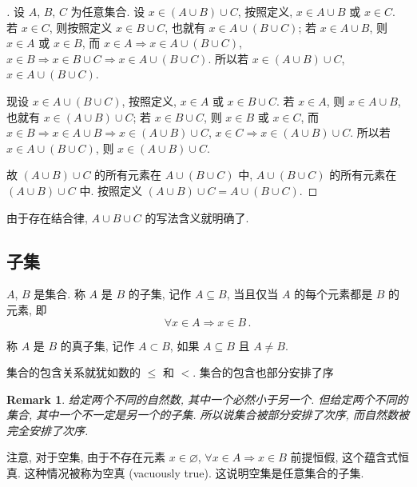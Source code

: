 \documentclass[UTF8]{ctexart}
\theoremstyle{mystyle}
\theoremstyle{myremark}
\newtheorem*{remark}{Remark}
\theoremstyle{plain}
\begin{document}
\begin{proof}[]
    设 $ A $, $ B $, $ C $ 为任意集合. 设 $ x \in (A \cup B) \cup C $, 按照定义, $ x \in A \cup B $ 或 $ x \in C $. 若 $ x \in C $, 则按照定义 $ x \in B \cup C $, 也就有 $ x \in A \cup (B \cup C) $; 若 $ x \in A \cup B $, 则 $ x \in A $ 或 $ x \in B $, 而 $ x \in A \Longrightarrow x \in A \cup (B \cup C) $, $ x \in B \Longrightarrow x \in B \cup C \Longrightarrow x \in A \cup (B \cup C) $. 所以若 $ x \in (A \cup B) \cup C $, $ x \in A \cup (B \cup C) $.

    现设 $ x \in A \cup (B \cup C) $, 按照定义, $ x \in A $ 或 $ x \in B \cup C $. 若 $ x \in A $, 则 $ x \in A \cup B $, 也就有 $ x \in (A \cup B) \cup C $; 若 $ x \in B \cup C $, 则 $ x \in B $ 或 $ x \in C $, 而 $ x \in B \Longrightarrow x \in A \cup B \Longrightarrow x \in (A \cup B) \cup C $, $ x \in C \Longrightarrow x \in (A \cup B) \cup C $. 所以若 $ x \in A \cup (B \cup C) $, 则 $ x \in (A \cup B) \cup C $.

    故 $ (A \cup B) \cup C $ 的所有元素在 $ A \cup (B \cup C) $ 中, $ A \cup (B \cup C) $ 的所有元素在 $ (A \cup B) \cup C $ 中. 按照定义 $ (A \cup B) \cup C = A \cup (B \cup C) $.
\end{proof}

由于存在结合律, $ A \cup B \cup C $ 的写法含义就明确了.


\subsection{子集}
\begin{definition}[\text{子集}]
    $ A $, $ B $ 是集合. 称 $ A $ 是 $ B $ 的子集, 记作 $ A \subseteq B $, 当且仅当 $ A $ 的每个元素都是 $ B $ 的元素, 即 \[ \forall x \in A \Longrightarrow x \in B \,.\]

    称 $ A $ 是 $ B $ 的真子集, 记作 $ A \subset B $, 如果 $ A \subseteq B $ 且 $ A \neq B $. 
\end{definition}

集合的包含关系就犹如数的 $ \leqslant $ 和 $ < $. 集合的包含也部分安排了序

\begin{remark}
    给定两个不同的自然数, 其中一个必然小于另一个. 但给定两个不同的集合, 其中一个不一定是另一个的子集. 所以说集合被部分安排了次序, 而自然数被完全安排了次序.
\end{remark}

注意, 对于空集, 由于不存在元素 $ x \in \varnothing $, $ \forall x \in A \Longrightarrow x \in B $ 前提恒假, 这个蕴含式恒真. 这种情况被称为空真 (vacuously true). 这说明空集是任意集合的子集.
\end{document}
